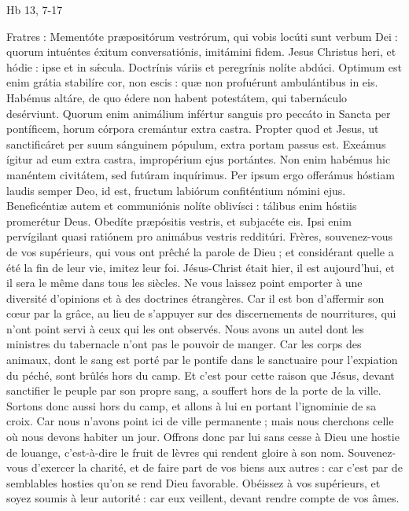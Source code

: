 \begin{paracol}{2}
Hb 13, 7-17
\switchcolumn

\switchcolumn*

Fratres : Mementóte præpositórum vestrórum, qui vobis locúti sunt verbum Dei : quorum intuéntes éxitum conversatiónis, imitámini fidem. Jesus Christus heri, et hódie : ipse et in sǽcula. Doctrínis váriis et peregrínis nolíte abdúci. Optimum est enim grátia stabilíre cor, non escis : quæ non profuérunt ambulántibus in eis. Habémus altáre, de quo édere non habent potestátem, qui tabernáculo desérviunt. Quorum enim animálium infértur sanguis pro peccáto in Sancta per pontíficem, horum córpora cremántur extra castra. Propter quod et Jesus, ut sanctificáret per suum sánguinem pópulum, extra portam passus est. Exeámus ígitur ad eum extra castra, impropérium ejus portántes. Non enim habémus hic manéntem civitátem, sed futúram inquírimus. Per ipsum ergo offerámus hóstiam laudis semper Deo, id est, fructum labiórum confiténtium nómini ejus. Beneficéntiæ autem et communiónis nolíte oblivísci : tálibus enim hóstiis promerétur Deus. Obedíte præpósitis vestris, et subjacéte eis. Ipsi enim pervígilant quasi ratiónem pro animábus vestris redditúri.
\switchcolumn
Frères, souvenez-vous de vos supérieurs, qui vous ont prêché la parole de Dieu ; et considérant quelle a été la fin de leur vie, imitez leur foi. Jésus-Christ était hier, il est aujourd’hui, et il sera le même dans tous les siècles. Ne vous laissez point emporter à une diversité d’opinions et à des doctrines étrangères. Car il est bon d’affermir son cœur par la grâce, au lieu de s’appuyer sur des discernements de nourritures, qui n’ont point servi à ceux qui les ont observés. Nous avons un autel dont les ministres du tabernacle n’ont pas le pouvoir de manger. Car les corps des animaux, dont le sang est porté par le pontife dans le sanctuaire pour l’expiation du péché, sont brûlés hors du camp. Et c’est pour cette raison que Jésus, devant sanctifier le peuple par son propre sang, a souffert hors de la porte de la ville. Sortons donc aussi hors du camp, et allons à lui en portant l’ignominie de sa croix. Car nous n’avons point ici de ville permanente ; mais nous cherchons celle où nous devons habiter un jour. Offrons donc par lui sans cesse à Dieu une hostie de louange, c’est-à-dire le fruit de lèvres qui rendent gloire à son nom. Souvenez-vous d’exercer la charité, et de faire part de vos biens aux autres : car c’est par de semblables hosties qu’on se rend Dieu favorable. Obéissez à vos supérieurs, et soyez soumis à leur autorité : car eux veillent, devant rendre compte de vos âmes.
\switchcolumn*


\end{paracol}
